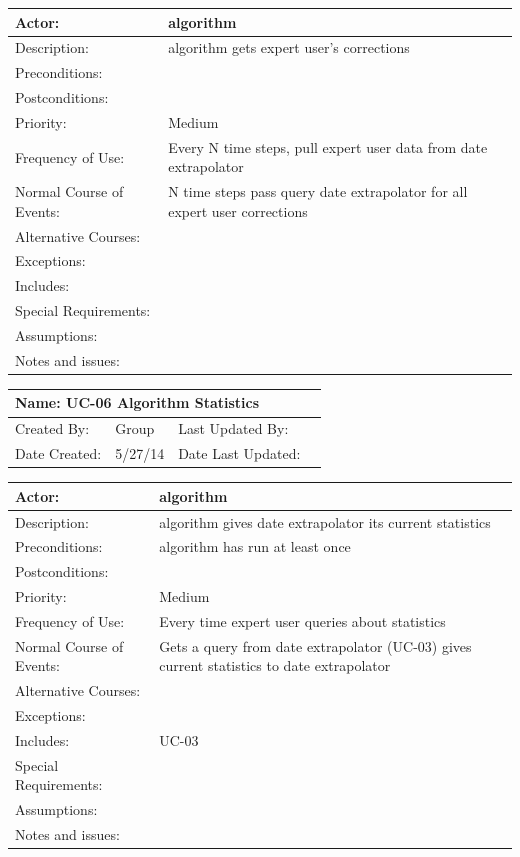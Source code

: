 \documentclass[11pt]{article}
\begin{document}
\begin{tabularx}{\textwidth}{|l|X|}
\hline
Actor: & algorithm\\\hline
Description: & algorithm gets expert user’s corrections\\\hline
Preconditions: & \\\hline
Postconditions: & \\\hline
Priority: & Medium\\\hline
Frequency of Use: & Every N time steps, pull expert user data from date extrapolator\\\hline
Normal Course of Events: & N time steps pass
    query date extrapolator for all expert user corrections\\\hline
Alternative Courses: & \\\hline
Exceptions: & \\\hline
Includes: & \\\hline
Special Requirements: & \\\hline
Assumptions: & \\\hline
Notes and issues: & \\\hline
\end{tabularx}
\newpage

\begin{tabularx}{\textwidth}{|l|X|X|X|}
\hline
\multicolumn{4}{|l|}{Name: UC-06    Algorithm Statistics}\\\hline
Created By: & Group & Last Updated By: &  \\\hline
Date Created: & 5/27/14 & Date Last Updated: &  \\\hline	
\end{tabularx}

\begin{tabularx}{\textwidth}{|l|X|}
\hline
Actor: & algorithm\\\hline
Description: & algorithm gives date extrapolator its current statistics\\\hline
Preconditions: & algorithm has run at least once\\\hline
Postconditions: & \\\hline
Priority: & Medium\\\hline
Frequency of Use: & Every time expert user queries about statistics\\\hline
Normal Course of Events: & Gets a query from date extrapolator (UC-03)
    gives current statistics to date extrapolator\\\hline
Alternative Courses: & \\\hline
Exceptions: & \\\hline
Includes: & UC-03\\\hline
Special Requirements: & \\\hline
Assumptions: & \\\hline
Notes and issues: & \\\hline
\end{tabularx}
\end{document}
